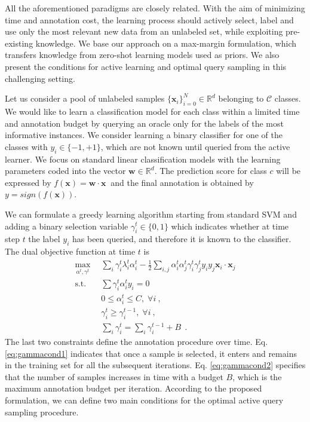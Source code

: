 \documentclass[10pt,twocolumn,letterpaper]{article}
\newcommand{\mb}[1]{\bm #1}
\newcommand{\eqr}[1]{Eq. \eqref{#1}}
\begin{document}
All the aforementioned paradigms are closely related. With the aim of minimizing time and annotation cost, the learning process should actively select, label and use only the most relevant new data from an unlabeled set, while exploiting pre-existing knowledge. We base our approach on a max-margin formulation, which transfers knowledge from zero-shot learning models used as priors. We also present the conditions for active learning and optimal query sampling in this challenging setting.


Let us consider a pool of unlabeled samples $\{\mb{x}_i\}_{i=0}^N \in \mathbb{R}^d$  belonging to $\mathcal{C}$ classes.
We would like to learn a classification model for each class within a limited time and annotation
budget by querying an oracle only for the labels of the most informative instances.
We consider learning a binary classifier for one of the classes with $y_i\in\{-1,+1\}$, which are not known until queried from the active learner.
We focus on standard linear classification models with the learning parameters coded into the vector $\mb{w} \in \mathbb{R}^d$.
The prediction score for class $c$ will be expressed by $f(\mb{x}) = \mb{w}\cdot\mb{x}~$ and the final annotation is obtained by $y = sign(f(\mb{x}))$.


We can formulate a greedy learning algorithm starting from standard SVM and adding a binary selection 
variable $\gamma_i^t\in \{0, 1\}$ which indicates whether at time 
step $t$ the label $y_i$ has been queried, and therefore it is known to the classifier.
The dual objective function at time $t$ is
\begin{align}
\max_{\alpha^t, \gamma^t}&\sum_i \gamma_i^t\lambda_i^t\alpha_i^t 
                        - \frac{1}{2} \sum_{i, j} \alpha_i^t \alpha_j^t \gamma_i^t \gamma_j^t y_i y_j\mb{x}_i\cdot \mb{x}_j \label{eq:sustlearn}\\
\textrm{s.t.} \quad & \sum \gamma_i^t \alpha^t_i y_i  = 0 \label{eq:sustlearn_equilibrium}\\
                    & 0 \leq \alpha^t_i \leq C, \; \forall i ~,\label{eq:sustlearn_positivealpha}\\
                    &\gamma_i^t \geq \gamma_i^{t-1}, \; \forall i ~,\label{eq:gammacond1}\\
		    &\sum_i \gamma_i^t = \sum_i \gamma_i^{t-1} +B~ \label{eq:gammacond2}~.
\end{align}
The last two constraints define the annotation procedure over time.
\eqr{eq:gammacond1} indicates that once a sample is selected, it enters and remains in the training 
set for all the subsequent iterations. \eqr{eq:gammacond2} specifies that the number of samples 
increases in time with a budget $B$, which is the maximum annotation budget per iteration. 
According to the proposed formulation, we can define two main conditions for the optimal active
query sampling procedure. 
\end{document}
